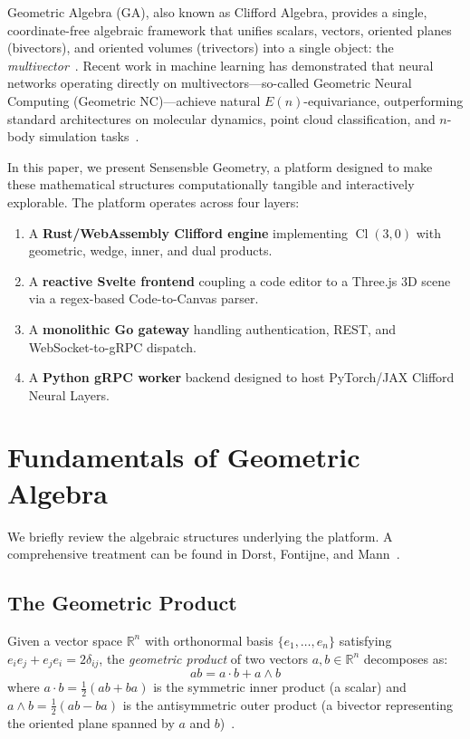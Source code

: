 \documentclass[conference]{IEEEtran}
\begin{document}
Geometric Algebra (GA), also known as Clifford Algebra, provides a single, coordinate-free algebraic framework that unifies scalars, vectors, oriented planes (bivectors), and oriented volumes (trivectors) into a single object: the \textit{multivector}~\cite{b_hestenes}. Recent work in machine learning has demonstrated that neural networks operating directly on multivectors---so-called Geometric Neural Computing (Geometric NC)---achieve natural $E(n)$-equivariance, outperforming standard architectures on molecular dynamics, point cloud classification, and $n$-body simulation tasks~\cite{b_satorras, b_ruhe}.

In this paper, we present Sensensble Geometry, a platform designed to make these mathematical structures computationally tangible and interactively explorable. The platform operates across four layers:
\begin{enumerate}
    \item A \textbf{Rust/WebAssembly Clifford engine} implementing $\operatorname{Cl}(3,0)$ with geometric, wedge, inner, and dual products.
    \item A \textbf{reactive Svelte frontend} coupling a code editor to a Three.js 3D scene via a regex-based Code-to-Canvas parser.
    \item A \textbf{monolithic Go gateway} handling authentication, REST, and WebSocket-to-gRPC dispatch.
    \item A \textbf{Python gRPC worker} backend designed to host PyTorch/JAX Clifford Neural Layers.
\end{enumerate}

\section{Fundamentals of Geometric Algebra}
\label{sec:ga}

We briefly review the algebraic structures underlying the platform. A comprehensive treatment can be found in Dorst, Fontijne, and Mann~\cite{b_dorst}.

\subsection{The Geometric Product}
Given a vector space $\mathbb{R}^n$ with orthonormal basis $\{e_1, \dots, e_n\}$ satisfying $e_i e_j + e_j e_i = 2\delta_{ij}$, the \textit{geometric product} of two vectors $a, b \in \mathbb{R}^n$ decomposes as:
\begin{equation}
    ab = a \cdot b + a \wedge b
    \label{eq:geom_prod}
\end{equation}
where $a \cdot b = \frac{1}{2}(ab + ba)$ is the symmetric inner product (a scalar) and $a \wedge b = \frac{1}{2}(ab - ba)$ is the antisymmetric outer product (a bivector representing the oriented plane spanned by $a$ and $b$)~\cite{b_hestenes}.
\end{document}
